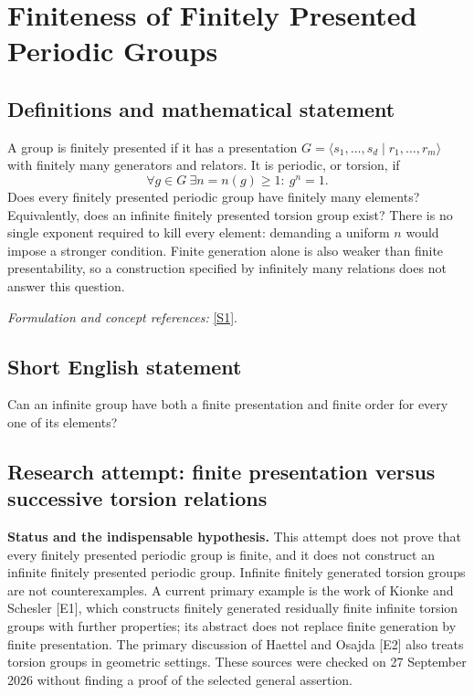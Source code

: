 \documentclass[11pt]{article}
\begin{document}
\section*{\texorpdfstring{Finiteness of Finitely Presented Periodic Groups}{Finiteness of Finitely Presented Periodic Groups}}\label{319}
\subsection{Definitions and mathematical statement}
A group is finitely presented if it has a presentation $G=\langle s_1,\ldots,s_d\mid r_1,\ldots,r_m\rangle$ with finitely many generators and relators. It is periodic, or torsion, if
\[
 \forall g\in G\ \exists n=n(g)\ge1:\ g^n=1.
\]
Does every finitely presented periodic group have finitely many elements? Equivalently, does an infinite finitely presented torsion group exist? There is no single exponent required to kill every element: demanding a uniform $n$ would impose a stronger condition. Finite generation alone is also weaker than finite presentability, so a construction specified by infinitely many relations does not answer this question.
\par\smallskip\textit{Formulation and concept references:} \href{https://groupprops.subwiki.org/wiki/Finitely_presented_periodic_group}{[S1]}.

\subsection{Short English statement}
Can an infinite group have both a finite presentation and finite order for every one of its elements?
\subsection{Research attempt: finite presentation versus successive torsion relations}
\textbf{Status and the indispensable hypothesis.} This attempt does not prove that every finitely presented periodic group is finite, and it does not construct an infinite finitely presented periodic group. Infinite finitely generated torsion groups are not counterexamples. A current primary example is the work of Kionke and Schesler [E1], which constructs finitely generated residually finite infinite torsion groups with further properties; its abstract does not replace finite generation by finite presentation. The primary discussion of Haettel and Osajda [E2] also treats torsion groups in geometric settings. These sources were checked on 27 September 2026 without finding a proof of the selected general assertion.
\end{document}
